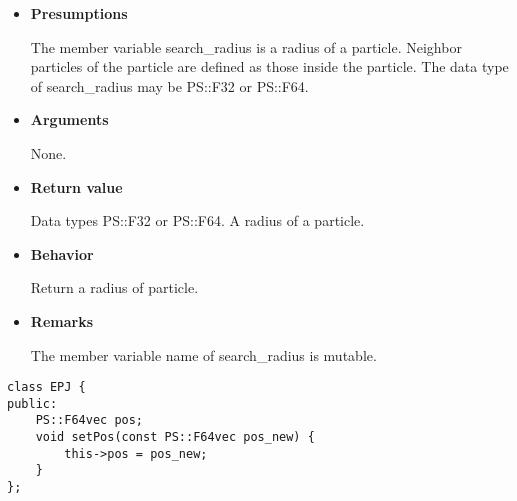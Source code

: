\begin{itemize}

\item {\bf Presumptions}

  The member variable search\_radius is a radius of a
  particle. Neighbor particles of the particle are defined as those
  inside the particle. The data type of search\_radius may be PS::F32
  or PS::F64.
  
\item {\bf Arguments}

  None.
  
\item {\bf Return value}

  Data types PS::F32 or PS::F64. A radius of a particle.
  
\item {\bf Behavior}

  Return a radius of particle.

\item {\bf Remarks}

  The member variable name of search\_radius is mutable.
  
\end{itemize}



\begin{screen}
\begin{verbatim}
class EPJ {
public:
    PS::F64vec pos;
    void setPos(const PS::F64vec pos_new) {
        this->pos = pos_new;
    }
};
\end{verbatim}
\end{screen}

